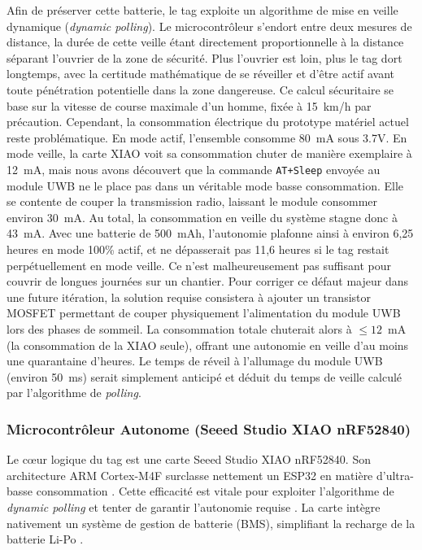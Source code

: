 Afin de préserver cette batterie, le tag exploite un algorithme de mise en veille dynamique (\textit{dynamic polling}). Le microcontrôleur s'endort entre deux mesures de distance, la durée de cette veille étant directement proportionnelle à la distance séparant l'ouvrier de la zone de sécurité. Plus l'ouvrier est loin, plus le tag dort longtemps, avec la certitude mathématique de se réveiller et d'être actif avant toute pénétration potentielle dans la zone dangereuse. Ce calcul sécuritaire se base sur la vitesse de course maximale d'un homme, fixée à 15~km/h par précaution.
\bigskip
Cependant, la consommation électrique du prototype matériel actuel reste problématique. En mode actif, l'ensemble consomme 80~mA sous 3.7V. En mode veille, la carte XIAO voit sa consommation chuter de manière exemplaire à 12~mA, mais nous avons découvert que la commande \texttt{AT+Sleep} envoyée au module UWB ne le place pas dans un véritable mode basse consommation. Elle se contente de couper la transmission radio, laissant le module consommer environ 30~mA. Au total, la consommation en veille du système stagne donc à 43~mA.
\bigskip
Avec une batterie de 500~mAh, l'autonomie plafonne ainsi à environ 6,25 heures en mode 100\% actif, et ne dépasserait pas 11,6 heures si le tag restait perpétuellement en mode veille. Ce n'est malheureusement pas suffisant pour couvrir de longues journées sur un chantier.
\bigskip
Pour corriger ce défaut majeur dans une future itération, la solution requise consistera à ajouter un transistor MOSFET permettant de couper physiquement l'alimentation du module UWB lors des phases de sommeil. La consommation totale chuterait alors à $\le 12$~mA (la consommation de la XIAO seule), offrant une autonomie en veille d'au moins une quarantaine d'heures. Le temps de réveil à l'allumage du module UWB (environ 50~ms) serait simplement anticipé et déduit du temps de veille calculé par l'algorithme de \textit{polling}.

\newpage
\subsubsection{Microcontrôleur Autonome (Seeed Studio XIAO nRF52840)}

Le cœur logique du tag est une carte Seeed Studio XIAO nRF52840. Son architecture ARM Cortex-M4F surclasse nettement un ESP32 en matière d'ultra-basse consommation \cite{XIAO_nRF52840}. Cette efficacité est vitale pour exploiter l'algorithme de \textit{dynamic polling} et tenter de garantir l'autonomie requise \cite{Desc_Projet}. La carte intègre nativement un système de gestion de batterie (BMS), simplifiant la recharge de la batterie Li-Po \cite{XIAO_nRF52840}.

